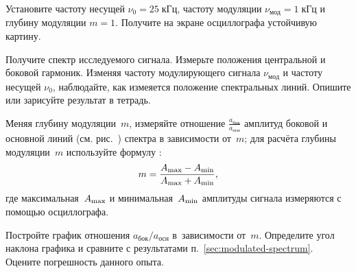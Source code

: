 \begin{lab:task}
\item Установите частоту несущей $\nu_0=25\;кГц$, частоту модуляции
$\nu_{мод} = 1\;кГц$ и глубину модуляции $m=1$.
Получите на экране осциллографа устойчивую картину.

\item Получите спектр исследуемого сигнала. Измерьте положения центральной
и боковой гармоник. Изменяя частоту модулирующего сигнала $\nu_{мод}$
и частоту несущей $\nu_0$, наблюдайте, как измеяется положение спектральных линий.
Опишите или зарисуйте результат в тетрадь.

\item Меняя глубину модуляции~$m$, измеряйте отношение $\frac{a_\text{бок}}{a_\text{осн}}$ 
амплитуд боковой и основной линий (см. рис.~) 
спектра  в зависимости от~$m$;
для расчёта глубины модуляции~$m$ используйте формулу :
\begin{equation*}
    m = \frac{A_{\rm max} - A_{\rm min}}{A_{\rm max} + A_{\rm min}},
\end{equation*}
где максимальная~$A_{\rm max}$ и минимальная~$A_{\rm min}$ амплитуды сигнала
измеряются с помощью осциллографа.

\item Постройте график отношения $a_\text{бок}/a_\text{осн}$
в~зависимости от~$m$. Определите угол наклона графика и сравните
с результатами п.~\ref{sec:modulated-spectrum}. Оцените погрешность данного опыта.

\end{lab:task}





